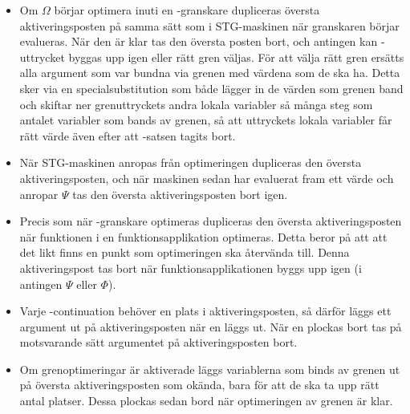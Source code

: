 \documentclass[../Optimise]{subfiles}
\begin{document}
\begin{itemize}
\item
Om $\Omega$ börjar optimera inuti en -granskare dupliceras översta aktiveringsposten 
på samma sätt som i STG-maskinen när granskaren börjar evalueras. När den är klar
tas den översta posten bort, och antingen kan -uttrycket byggas upp igen
eller rätt gren väljas. För att välja rätt gren ersätts alla argument som var
bundna via grenen med värdena som de ska ha. Detta sker via en specialsubstitution 
som både lägger in de värden som grenen band och skiftar ner grenuttryckets andra lokala 
variabler så många steg som antalet variabler som bands av grenen, så att uttryckets
lokala variabler får rätt värde även efter att -satsen tagits bort.

\item
När STG-maskinen anropas från optimeringen dupliceras den översta aktiveringsposten,
och när maskinen sedan har evaluerat fram ett värde och anropar $\Psi$ tas den översta aktiveringsposten bort igen.

\item
Precis som när -granskare optimeras dupliceras den översta aktiveringsposten när
funktionen i en funktionsapplikation optimeras. Detta beror på att att det likt 
finns en punkt som optimeringen ska återvända till. Denna aktiveringspost tas bort när 
funktionsapplikationen byggs upp igen (i antingen $\Psi$ eller $\Phi$). 

\item
Varje -continuation behöver en plats i aktiveringsposten, så därför
läggs ett argument ut på aktiveringsposten när en  läggs ut.
När en  plockas bort tas på motsvarande sätt argumentet på aktiveringsposten bort.

\item
Om grenoptimeringar är aktiverade läggs variablerna som binds av grenen ut på
översta aktiveringsposten som okända, bara för att de ska ta upp rätt antal platser.
Dessa plockas sedan bord när optimeringen av grenen är klar. 


\end{itemize}
\end{document}
